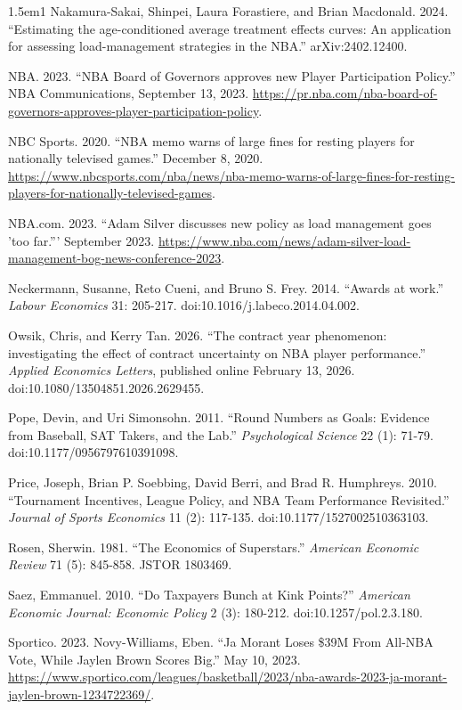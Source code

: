 \documentclass[11pt]{article}
\begin{document}
\begin{hangparas}{1.5em}{1}
Nakamura-Sakai, Shinpei, Laura Forastiere, and Brian Macdonald. 2024. ``Estimating the age-conditioned average treatment effects curves: An application for assessing load-management strategies in the NBA.'' arXiv:2402.12400.

NBA. 2023. ``NBA Board of Governors approves new Player Participation Policy.'' NBA Communications, September 13, 2023. \url{https://pr.nba.com/nba-board-of-governors-approves-player-participation-policy}.

NBC Sports. 2020. ``NBA memo warns of large fines for resting players for nationally televised games.'' December 8, 2020. \url{https://www.nbcsports.com/nba/news/nba-memo-warns-of-large-fines-for-resting-players-for-nationally-televised-games}.

NBA.com. 2023. ``Adam Silver discusses new policy as load management goes 'too far.''' September 2023. \url{https://www.nba.com/news/adam-silver-load-management-bog-news-conference-2023}.

Neckermann, Susanne, Reto Cueni, and Bruno S. Frey. 2014. ``Awards at work.'' \emph{Labour Economics} 31: 205-217. doi:10.1016/j.labeco.2014.04.002.

Owsik, Chris, and Kerry Tan. 2026. ``The contract year phenomenon: investigating the effect of contract uncertainty on NBA player performance.'' \emph{Applied Economics Letters}, published online February 13, 2026. doi:10.1080/13504851.2026.2629455.

Pope, Devin, and Uri Simonsohn. 2011. ``Round Numbers as Goals: Evidence from Baseball, SAT Takers, and the Lab.'' \emph{Psychological Science} 22 (1): 71-79. doi:10.1177/0956797610391098.

Price, Joseph, Brian P. Soebbing, David Berri, and Brad R. Humphreys. 2010. ``Tournament Incentives, League Policy, and NBA Team Performance Revisited.'' \emph{Journal of Sports Economics} 11 (2): 117-135. doi:10.1177/1527002510363103.

Rosen, Sherwin. 1981. ``The Economics of Superstars.'' \emph{American Economic Review} 71 (5): 845-858. JSTOR 1803469.

Saez, Emmanuel. 2010. ``Do Taxpayers Bunch at Kink Points?'' \emph{American Economic Journal: Economic Policy} 2 (3): 180-212. doi:10.1257/pol.2.3.180.

Sportico. 2023. Novy-Williams, Eben. ``Ja Morant Loses \$39M From All-NBA Vote, While Jaylen Brown Scores Big.'' May 10, 2023. \url{https://www.sportico.com/leagues/basketball/2023/nba-awards-2023-ja-morant-jaylen-brown-1234722369/}.


\end{hangparas}
\end{document}
